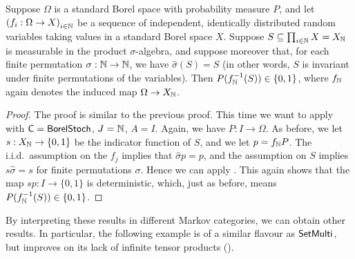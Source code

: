 \documentclass[11pt]{article}
\begin{document}
\begin{corollary}
    Suppose $\Omega$ is a standard Borel space with probability measure $P$, and let $\left(f_i: \Omega \to X\right)_{i\in \mathbb{N}}$ be a sequence of independent, identically distributed random variables taking values in a standard Borel space $X$.
    Suppose $S \subseteq \prod_{i \in \mathbb{N}} X = X_{\mathbb{N}}$ is measurable in the product $\sigma$-algebra, and suppose moreover that, for each finite permutation $\sigma: \mathbb{N} \to \mathbb{N}$, we have $\hat{\sigma}(S) = S$ (in other words, $S$ is invariant under finite permutations of the variables).
    Then $P(f_{\mathbb{N}}^{-1}(S)) \in \{0,1\}$, where $f_{\mathbb{N}}$ again denotes the induced map $\Omega \to X_{\mathbb{N}}$.
  \end{corollary}

\begin{proof}
    The proof is similar to the previous proof. This time we want to apply  with $\mathsf{C} = \operatorname{\mathsf{BorelStoch}}$, $J = \mathbb{N}$, $A = I$.
    Again, we have $P: I \to \Omega$.
    As before, we let $s: X_{\mathbb{N}} \to \{0,1\}$ be the indicator function of $S$, and we let $p = f_{\mathbb{N}} P$.
    The i.i.d.~assumption on the $f_j$ implies that $\hat{\sigma}p = p$, and the assumption on $S$ implies $s\hat{\sigma} = s$ for finite permutations $\sigma$.
    Hence we can apply . This again shows that the map $sp: I \to \{0,1\}$ is deterministic, which, just as before, means $P(f_{\mathbb{N}}^{-1}(S)) \in \{0,1\}$.
\end{proof} 

By interpreting these results in different Markov categories, we can obtain other results.
In particular, the following example is of a similar flavour as $\operatorname{\mathsf{SetMulti}}$, but improves on its lack of infinite tensor products ().
\end{document}
